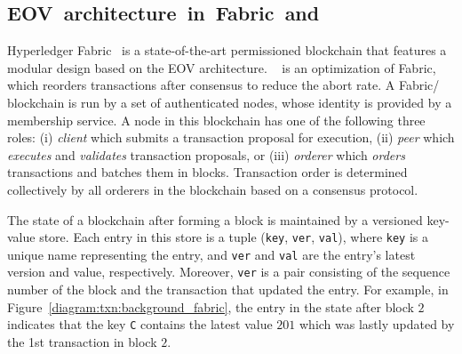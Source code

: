 \subsection{EOV~architecture~in~Fabric~and~{\fabricPlusplus}}
\label{sec:txn:background_fabric}

Hyperledger Fabric~\cite{androulaki2018hyperledger} is a state-of-the-art
permissioned blockchain that features a modular design based on the EOV architecture.
%
{\fabricPlusplus}~\cite{sharma2019blurring} is an optimization of Fabric, which reorders transactions after consensus to reduce the abort rate.
%
A Fabric/{\fabricPlusplus} blockchain is run by a set of authenticated nodes, whose identity is
provided by a membership service.
%
A node in this blockchain has one of the following three roles:
%
(i) \textit{client} which submits a transaction proposal for execution,
%
(ii) \textit{peer} which \textit{executes} and \textit{validates}
transaction proposals,
%
or (iii) \textit{orderer} which \textit{orders} transactions and batches
them in blocks.
%
Transaction order is determined collectively by all orderers in
the blockchain based on a consensus protocol.
%

The state of a blockchain after forming a block is maintained by a
versioned key-value store.
% 
Each entry in this store is a tuple (\texttt{key}, \texttt{ver},
\texttt{val}), where \texttt{key} is a unique name representing the entry, and
\texttt{ver} and \texttt{val} are the entry's latest version and value, respectively.
% 
Moreover, \texttt{ver} is a pair consisting of the sequence number of the block
and the transaction that updated the entry.
%
For example, in Figure~\ref{diagram:txn:background_fabric}, the entry  in
the state after block $2$ indicates that the key \texttt{C} contains the latest
value $201$ which was lastly updated by the 1st transaction in block $2$.

